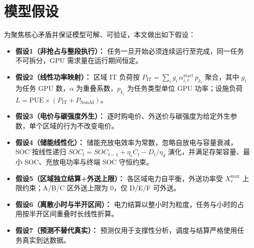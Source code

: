 \section{模型假设}

为聚焦核心矛盾并保证模型可解、可验证，本文做出如下假设：

\begin{itemize}[itemindent=2em]
\item \textbf{假设1（非抢占与整段执行）：} 任务一旦开始必须连续运行至完成，同一任务不可拆分，GPU 需求量在运行期间恒定。
\item \textbf{假设2（线性功率映射）：} 区域 IT 负荷按 $P_{\mathrm{IT}}=\sum_{i} g_i\,\alpha_{i,t}^{\mathrm{start}}\,p_{k_i}$ 聚合，其中 $g_i$ 为任务 GPU 数，$\alpha$ 为重叠系数，$p_{k_i}$ 为任务类型单位 GPU 功率；设施负荷 $L=\mathrm{PUE}\times(P_{\mathrm{IT}}+P_{\mathrm{NonAI}})$。
\item \textbf{假设3（电价与碳强度外生）：} 逐时购电价、外送价与碳强度为给定外生参数，单个区域的行为不改变电价。
\item \textbf{假设4（储能线性化）：} 储能充放电效率为常数，忽略自放电与容量衰减，SOC 按线性递归 $SOC_t=SOC_{t-1}+\eta_c C_t - D_t/\eta_d$ 演化，并满足存架容量、最小 SOC、充放电功率与终端 SOC 守恒约束。
\item \textbf{假设5（区域独立结算+外送上限）：} 各区域电力自平衡，外送功率受 $X_r^{\max}$ 上限约束；A/B/C 区外送上限为 0，仅 D/E/F 可外送。
\item \textbf{假设6（离散小时与半开区间）：} 电力结算以整小时为粒度，任务与小时的占用按半开区间重叠时长线性折算。
\item \textbf{假设7（预测不替代真实）：} 预测仅用于支撑性分析，调度与结算严格使用任务真实到达数据。
\end{itemize}
